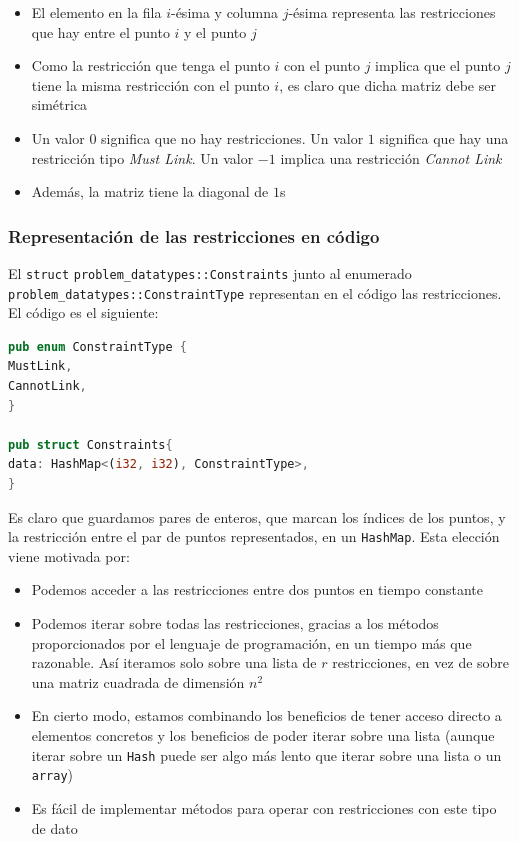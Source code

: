 \documentclass[11pt]{article}
\begin{document}
\begin{itemize}
\item El elemento en la fila $i$-ésima y columna $j$-ésima representa las restricciones que hay entre el punto $i$ y el punto $j$
\item Como la restricción que tenga el punto $i$ con el punto $j$ implica que el punto $j$ tiene la misma restricción con el punto $i$, es claro que dicha matriz debe ser simétrica
\item Un valor $0$ significa que no hay restricciones. Un valor $1$ significa que hay una restricción tipo \emph{Must Link}. Un valor $-1$ implica una restricción \emph{Cannot Link}
\item Además, la matriz tiene la diagonal de $1$s
\end{itemize}

\subsubsection{Representación de las restricciones en código}

El \lstinline{struct} \lstinline{problem_datatypes::Constraints} junto al enumerado \lstinline{problem_datatypes::ConstraintType} representan en el código las restricciones. El código es el siguiente:

\begin{lstlisting}[language=Rust, style=Boxed]
pub enum ConstraintType {
MustLink,
CannotLink,
}

pub struct Constraints{
data: HashMap<(i32, i32), ConstraintType>,
}
\end{lstlisting}

Es claro que guardamos pares de enteros, que marcan los índices de los puntos, y la restricción entre el par de puntos representados, en un \lstinline{HashMap}. Esta elección viene motivada por:

\begin{itemize}
\item Podemos acceder a las restricciones entre dos puntos en tiempo constante
\item Podemos iterar sobre todas las restricciones, gracias a los métodos proporcionados por el lenguaje de programación, en un tiempo más que razonable. Así iteramos solo sobre una lista de $r$ restricciones, en vez de sobre una matriz cuadrada de dimensión $n^2$
\item En cierto modo, estamos combinando los beneficios de tener acceso directo a elementos concretos y los beneficios de poder iterar sobre una lista (aunque iterar sobre un \lstinline{Hash} puede ser algo más lento que iterar sobre una lista o un \lstinline{array})
\item Es fácil de implementar métodos para operar con restricciones con este tipo de dato
\end{itemize}
\end{document}
